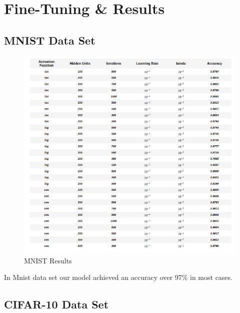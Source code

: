 \documentclass[11pt]{article}
\begin{document}
\newpage

\section{Fine-Tuning \& Results}

\subsection{MNIST Data Set}

\begin{figure}[ht!]
  \includegraphics[width=\linewidth]{./Project_1_files/Mnist.png}
  \caption{MNIST Results}
  \label{fig:mnist_results}
\end{figure}

\noindent In Mnist data set our model achieved an accuracy over 97\% in most cases. 
\newpage

\subsection{CIFAR-10 Data Set}
\end{document}
